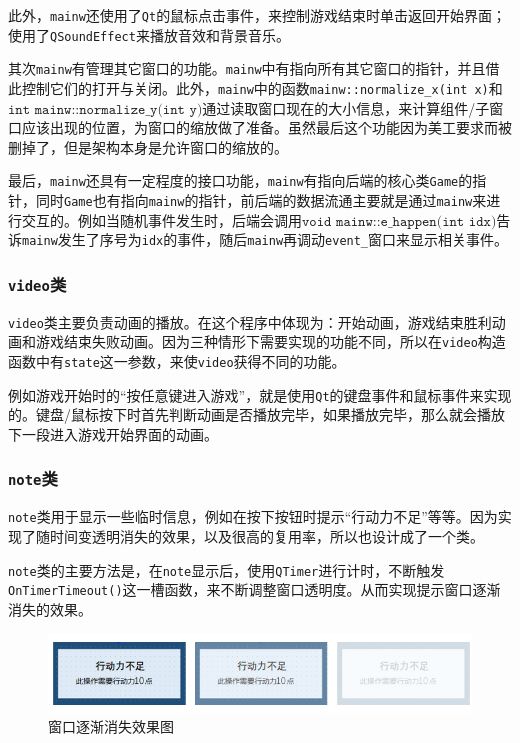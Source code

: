 \documentclass[hyperref,a4paper,UTF8]{ctexart}
\begin{document}
此外，\texttt{mainw}还使用了\texttt{Qt}的鼠标点击事件，来控制游戏结束时单击返回开始界面；使用了\texttt{QSoundEffect}来播放音效和背景音乐。

其次\texttt{mainw}有管理其它窗口的功能。\texttt{mainw}中有指向所有其它窗口的指针，并且借此控制它们的打开与关闭。此外，\texttt{mainw}中的函数\texttt{mainw::normalize\_x(int x)}和$\texttt{int mainw::normalize\_y(int y)}$通过读取窗口现在的大小信息，来计算组件/子窗口应该出现的位置，为窗口的缩放做了准备。虽然最后这个功能因为美工要求而被删掉了，但是架构本身是允许窗口的缩放的。

最后，\texttt{mainw}还具有一定程度的接口功能，\texttt{mainw}有指向后端的核心类\texttt{Game}的指针，同时\texttt{Game}也有指向\texttt{mainw}的指针，前后端的数据流通主要就是通过\texttt{mainw}来进行交互的。例如当随机事件发生时，后端会调用$\texttt{void mainw::e\_happen(int idx)}$告诉\texttt{mainw}发生了序号为\texttt{idx}的事件，随后\texttt{mainw}再调动\texttt{event\_}窗口来显示相关事件。

\subsubsection{\texttt{video}类}

\texttt{video}类主要负责动画的播放。在这个程序中体现为：开始动画，游戏结束胜利动画和游戏结束失败动画。因为三种情形下需要实现的功能不同，所以在\texttt{video}构造函数中有\texttt{state}这一参数，来使\texttt{video}获得不同的功能。

例如游戏开始时的“按任意键进入游戏”，就是使用\texttt{Qt}的键盘事件和鼠标事件来实现的。键盘/鼠标按下时首先判断动画是否播放完毕，如果播放完毕，那么就会播放下一段进入游戏开始界面的动画。

\subsubsection{\texttt{note}类}

\texttt{note}类用于显示一些临时信息，例如在按下按钮时提示“行动力不足”等等。因为实现了随时间变透明消失的效果，以及很高的复用率，所以也设计成了一个类。

\texttt{note}类的主要方法是，在\texttt{note}显示后，使用\texttt{QTimer}进行计时，不断触发\texttt{OnTimerTimeout()}这一槽函数，来不断调整窗口透明度。从而实现提示窗口逐渐消失的效果。

\begin{figure}[h]
    \centering
    \includegraphics{fade.png}
    \caption{窗口逐渐消失效果图}
\end{figure}
\end{document}
